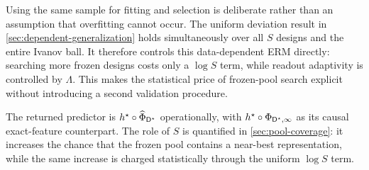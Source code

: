 Using the same sample for fitting and selection is deliberate rather than an
assumption that overfitting cannot occur.  The uniform deviation result in
\cref{sec:dependent-generalization} holds simultaneously over all $S$ designs
and the entire Ivanov ball.  It therefore controls this data-dependent ERM
directly: searching more frozen designs costs only a $\log S$ term, while
readout adaptivity is controlled by $\Lambda$.  This makes the statistical
price of frozen-pool search explicit without introducing a second validation
procedure.

The returned predictor is
${h^{\star}}\circ\widehat\Phi_{{\mathsf{D}^{\star}}}$ operationally,
with ${h^{\star}}\circ\Phi_{{\mathsf{D}^{\star}},\infty}$ as its causal
exact-feature counterpart.  The role of $S$ is quantified in
\cref{sec:pool-coverage}: it increases the chance that the frozen pool contains
a near-best representation, while the same increase is charged statistically
through the uniform $\log S$ term.
